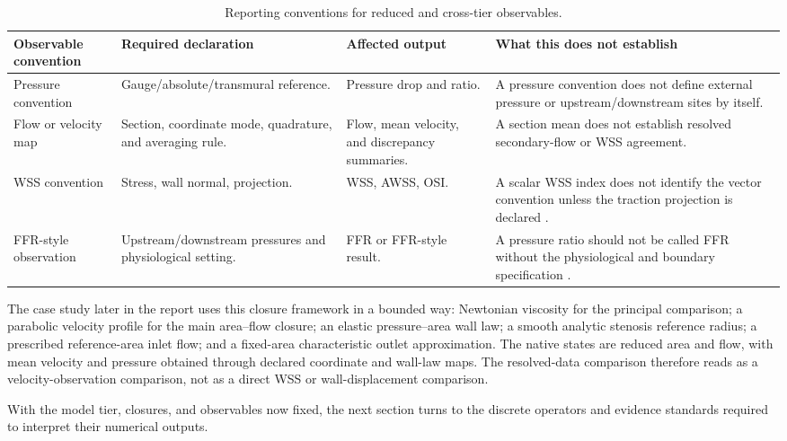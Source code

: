 \begin{table}[!htb]
    \centering
    \scriptsize
    \caption{Reporting conventions for reduced and cross-tier observables.}
    \label{tab:modeling-observable-reporting-conventions}
    \begin{tabularx}{\textwidth}{@{}
        >{\raggedright\arraybackslash}p{}
        >{\raggedright\arraybackslash}p{}
        >{\raggedright\arraybackslash}p{}
        >{\raggedright\arraybackslash}X@{}}
        \toprule
        \textbf{Observable convention}
            & \textbf{Required declaration}
            & \textbf{Affected output}
            & \textbf{What this does not establish} \\
        \midrule
        Pressure convention
            & Gauge/absolute/transmural reference.
            & Pressure drop and ratio.
            & A pressure convention does not define external pressure or
            upstream/downstream sites by itself. \\
        Flow or velocity map
            & Section, coordinate mode, quadrature, and averaging rule.
            & Flow, mean velocity, and discrepancy summaries.
            & A section mean does not establish resolved secondary-flow or WSS
            agreement. \\
        WSS convention
            & Stress, wall normal, projection.
            & WSS, AWSS, OSI.
            & A scalar WSS index does not identify the vector convention unless
            the traction projection is declared
            \cite{JohnEtAl2017WallShearStressVectorForm}. \\
        FFR-style observation
            & Upstream/downstream pressures and physiological setting.
            & FFR or FFR-style result.
            & A pressure ratio should not be called FFR without the physiological
            and boundary specification \cite{Blanco2018FFR1D3D}. \\
        \bottomrule
    \end{tabularx}
\end{table}

\begin{stenosisillustration}
\label{ex:stenosisillustration-modeling-closures}
The case study later in the report uses this closure framework in a bounded
way: Newtonian viscosity for the principal comparison; a parabolic velocity
profile for the main area--flow closure; an elastic pressure--area wall law; a
smooth analytic stenosis reference radius; a prescribed reference-area inlet
flow; and a fixed-area characteristic outlet approximation. The native states
are reduced area and flow, with mean velocity and pressure obtained through
declared coordinate and wall-law maps. The resolved-data comparison therefore
reads as a velocity-observation comparison, not as a direct WSS or
wall-displacement comparison.
\end{stenosisillustration}

With the model tier, closures, and observables now fixed, the next section
turns to the discrete operators and evidence standards required to interpret
their numerical outputs.
